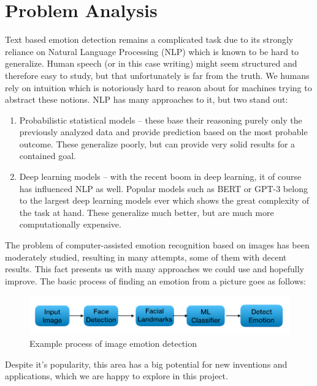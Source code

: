 \documentclass{ledger}
\begin{document}
\section{Problem Analysis}

Text based emotion detection remains a complicated task due to its strongly reliance on Natural Language Processing (NLP) which is known to be hard to generalize. Human speech (or in this case writing) might seem structured and therefore easy to study, but that unfortunately is far from the truth. We humans rely on intuition which is notoriously hard to reason about for machines trying to abstract these notions. NLP has many approaches to it, but two stand out:

\begin{enumerate}
	\item Probabilistic statistical models -- these base their reasoning purely only the previously analyzed data and provide prediction based on the most probable outcome. These generalize poorly, but can provide very solid results for a contained goal.

	\item Deep learning models -- with the recent boom in deep learning, it of course has influenced NLP as well. Popular models such as BERT or GPT-3 belong to the largest deep learning models ever which shows the great complexity of the task at hand. These generalize much better, but are much more computationally expensive\cite{https://doi.org/10.48550/arxiv.2005.00547}.
\end{enumerate}
\noindent
The problem of computer-assisted emotion recognition based on images has been moderately studied, resulting in many attempts, some of them with decent results. This fact presents us with many approaches we could use and hopefully improve. The basic process of finding an emotion from a picture goes as follows:

\begin{figure}[H]
	\includegraphics[width=15cm]{assets/emotion_recognition_process.png}
	\caption{Example process of image emotion detection}
	\centering
\end{figure}

Despite it's popularity, this area has a big potential for new inventions and applications, which we are happy to explore in this project.
\end{document}
